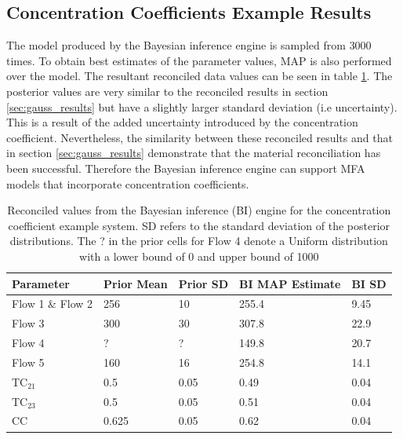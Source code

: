 \documentclass[ %
                    author={Tom Jager},
                supervisor={Dr. Daniel Schien},
                    degree={MEng},
                     title={A Bayesian Inference Engine for Calibrating Uncertainty over UMIS Structured MFA Systems},
                  subtitle={},
                      type={research},
                      year={2019} ]{dissertation}
\begin{document}
\subsection{Concentration Coefficients Example Results}
The model produced by the Bayesian inference engine is sampled from $3000$ times. To obtain best estimates of the parameter values, MAP is also performed over the model. The resultant reconciled data values can be seen in table \ref{table:conc_coeff_results}. The posterior values are very similar to the reconciled results in section \ref{sec:gauss_results} but have a slightly larger standard deviation (i.e uncertainty). This is a result of the added uncertainty introduced by the concentration coefficient. Nevertheless, the similarity between these reconciled results and that in section \ref{sec:gauss_results} demonstrate that the material reconciliation has been successful. Therefore the Bayesian inference engine can support MFA models that incorporate concentration coefficients. 

\begin{table}[]
\center
\begin{tabular}{|l|l|l|l|l|}
\hline
\textbf{Parameter} & \textbf{Prior Mean} & \textbf{Prior SD} & \textbf{BI MAP Estimate} & \textbf{BI SD} \\ \hline
Flow 1 \& Flow 2   & 256                 & 10                & 255.4                    & 9.45           \\ \hline
Flow 3             & 300                 & 30                & 307.8                    & 22.9           \\ \hline
Flow 4             & ?                   & ?                 & 149.8                    & 20.7           \\ \hline
Flow 5             & 160                 & 16                & 254.8                    & 14.1           \\ \hline
TC$_{21}$               & 0.5                 & 0.05              & 0.49                     & 0.04           \\ \hline
TC$_{23}$               & 0.5                 & 0.05              & 0.51                     & 0.04           \\ \hline
CC                 & 0.625               & 0.05              & 0.62                     & 0.04           \\ \hline
\end{tabular}
\caption{Reconciled values from the Bayesian inference (BI) engine for the concentration coefficient example system. SD refers to the standard deviation of the posterior distributions. The ? in the prior cells for Flow 4 denote a Uniform distribution with a lower bound of 0 and upper bound of 1000}
\label{table:conc_coeff_results}
\end{table}
\end{document}

